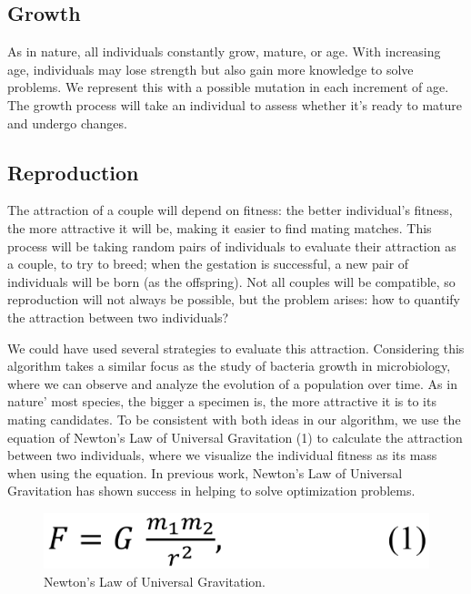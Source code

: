 \documentclass[runningheads]{llncs}
\begin{document}
\subsection{Growth}

As in nature, all individuals constantly grow, mature, or age. With increasing
age, individuals may lose strength but also gain more knowledge to solve
problems. We represent this with a possible mutation in each increment of age.
The growth process will take an individual to assess whether it's ready to
mature and undergo changes.

\subsection{Reproduction}

The attraction of a couple will depend on fitness: the better individual's
fitness, the more attractive it will be, making it easier to find mating
matches. This process will be taking random pairs of individuals to evaluate
their attraction as a couple, to try to breed; when the gestation is
successful, a new pair of individuals will be born (as the offspring). Not all
couples will be compatible, so reproduction will not always be possible, but
the problem arises: how to quantify the attraction between two individuals?

We could have used several strategies to evaluate this attraction. Considering
this algorithm takes a similar focus as the study of bacteria growth in
microbiology, where we can observe and analyze the evolution of a population
over time. As in nature' most species, the bigger a specimen is, the more
attractive it is to its mating candidates. To be consistent with both ideas in
our algorithm, we use the equation of Newton's Law of Universal Gravitation (1)
to calculate the attraction between two individuals, where we visualize the
individual fitness as its mass when using the equation. In previous work,
Newton's Law of Universal Gravitation has shown success in helping to solve
optimization problems.

\begin{figure}
    \includegraphics[width=\textwidth]{img/fig3_newtonslaw.pdf}
    \caption{Newton's Law of Universal Gravitation.} \label{fig3}
    \end{figure}
\end{document}
